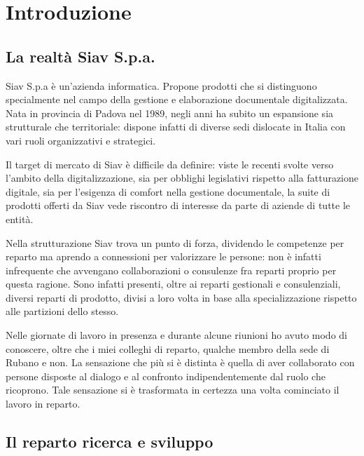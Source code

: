 
\chapter{Introduzione}
\label{cap:introduzione}
\section{La realtà Siav S.p.a.}
\label{sec:realtaSiav}
Siav S.p.a è un'azienda informatica. Propone prodotti che si distinguono specialmente nel campo della gestione e elaborazione documentale digitalizzata. Nata in provincia di Padova nel 1989, negli anni ha subito un espansione sia strutturale che territoriale: dispone infatti di diverse sedi dislocate in Italia con vari ruoli organizzativi e strategici.

Il target di mercato di Siav è difficile da definire: viste le recenti svolte verso l'ambito della digitalizzazione, sia per obblighi legislativi rispetto alla fatturazione digitale, sia per l'esigenza di comfort nella gestione documentale, la suite di prodotti offerti da Siav vede riscontro di interesse da parte di aziende di tutte le entità.

Nella strutturazione Siav trova un punto di forza, dividendo le competenze per reparto ma aprendo a connessioni per valorizzare le persone: non è infatti infrequente che avvengano collaborazioni o consulenze fra reparti proprio per questa ragione. Sono infatti presenti, oltre ai reparti gestionali e consulenziali, diversi reparti di prodotto, divisi a loro volta in base alla specializzazione rispetto alle partizioni dello stesso.

Nelle giornate di lavoro in presenza e durante alcune riunioni ho avuto modo di conoscere, oltre che i miei colleghi di reparto, qualche membro della sede di Rubano e non. La sensazione che più si è distinta è quella di aver collaborato con persone disposte al dialogo e al confronto indipendentemente dal ruolo che ricoprono. Tale sensazione si è trasformata in certezza una volta cominciato il lavoro in reparto.


\section{Il reparto ricerca e sviluppo}

